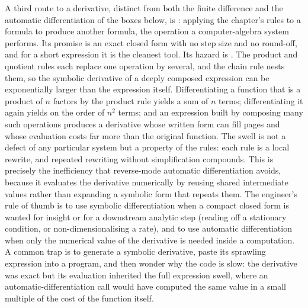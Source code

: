 \begin{mastery}
A third route to a derivative, distinct from both the finite
difference and the automatic differentiation of the boxes below, is
: applying the chapter's rules to a
formula to produce another formula, the operation a computer-algebra
system performs. Its promise is an exact closed form with no step size
and no round-off, and for a short expression it is the cleanest tool.
Its hazard is . The product and quotient
rules each replace one operation by several, and the chain rule nests
them, so the symbolic derivative of a deeply composed expression can be
exponentially larger than the expression itself. Differentiating a
function that is a product of $n$ factors by the product rule yields a
sum of $n$ terms; differentiating it again yields on the order of
$n^{2}$ terms; and an expression built by composing many such
operations produces a derivative whose written form can fill pages and
whose evaluation costs far more than the original function. The swell
is not a defect of any particular system but a property of the rules:
each rule is a local rewrite, and repeated rewriting without
simplification compounds. This is precisely the inefficiency that
reverse-mode automatic differentiation avoids, because it evaluates the
derivative numerically by reusing shared intermediate values rather
than expanding a symbolic form that repeats them. The engineer's rule
of thumb is to use symbolic differentiation when a compact closed form
is wanted for insight or for a downstream analytic step (reading off a
stationary condition, or non-dimensionalising a rate), and to use
automatic differentiation when only the numerical value of the
derivative is needed inside a computation. A common trap is to
generate a symbolic derivative, paste its sprawling expression into a
program, and then wonder why the code is slow: the derivative was
exact but its evaluation inherited the full expression swell, where an
automatic-differentiation call would have computed the same value in a
small multiple of the cost of the function itself.
\end{mastery}


